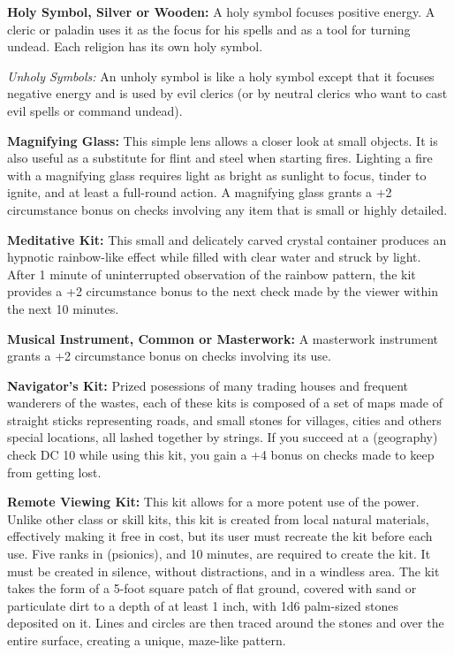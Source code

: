 \textbf{Holy Symbol, Silver or Wooden:} A holy symbol focuses positive energy. A cleric or paladin uses it as the focus for his spells and as a tool for turning undead. Each religion has its own holy symbol.

 \textit{Unholy Symbols:} An unholy symbol is like a holy symbol except that it focuses negative energy and is used by evil clerics (or by neutral clerics who want to cast evil spells or command undead).

\textbf{Magnifying Glass:} This simple lens allows a closer look at small objects. It is also useful as a substitute for flint and steel when starting fires. Lighting a fire with a magnifying glass requires light as bright as sunlight to focus, tinder to ignite, and at least a full-round action. A magnifying glass grants a +2 circumstance bonus on  checks involving any item that is small or highly detailed.

\textbf{Meditative Kit:} This small and delicately carved crystal  container produces an hypnotic rainbow-like effect while  filled with clear water and struck by light. After 1 minute of  uninterrupted observation of the rainbow pattern, the kit  provides a +2 circumstance bonus to the next   check made by the viewer within the next 10 minutes.

\textbf{Musical Instrument, Common or Masterwork:} A masterwork instrument grants a +2 circumstance bonus on  checks involving its use.

\textbf{Navigator's Kit:} Prized posessions of many trading houses and frequent wanderers of the wastes, each of these kits is composed of a set of maps made of straight sticks representing roads, and small stones for villages, cities and others special locations, all lashed together by strings. If you succeed at a  (geography) check DC 10 while using this kit, you gain a +4 bonus on  checks made to keep from getting lost.

\textbf{Remote Viewing Kit:} This kit allows for a more potent  use of the  power. Unlike other class or skill  kits, this kit is created from local natural materials,  effectively making it free in cost, but its user must recreate  the kit before each use. Five ranks in  (psionics),  and 10 minutes, are required to create the kit. It must be  created in silence, without distractions, and in a windless  area. The kit takes the form of a 5-foot square patch of flat  ground, covered with sand or particulate dirt to a depth of  at least 1 inch, with 1d6 palm-sized stones deposited on it.  Lines and circles are then traced around the stones and over  the entire surface, creating a unique, maze-like pattern.

